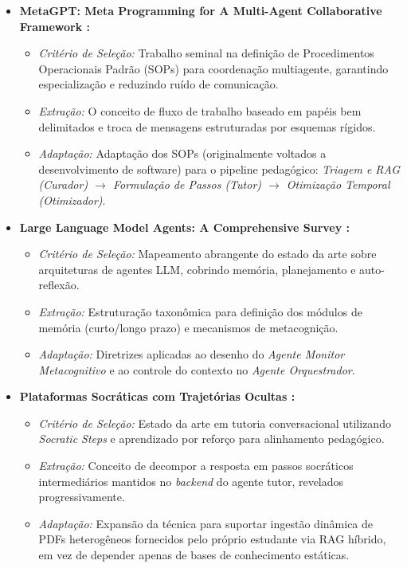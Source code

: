 \documentclass[12pt]{article}
\begin{document}
\begin{itemize}
    \item \textbf{MetaGPT: Meta Programming for A Multi-Agent Collaborative Framework \cite{hong2024metagpt}:}
    \begin{itemize}
        \item \textit{Critério de Seleção:} Trabalho seminal na definição de Procedimentos Operacionais Padrão (SOPs) para coordenação multiagente, garantindo especialização e reduzindo ruído de comunicação.
        \item \textit{Extração:} O conceito de fluxo de trabalho baseado em papéis bem delimitados e troca de mensagens estruturadas por esquemas rígidos.
        \item \textit{Adaptação:} Adaptação dos SOPs (originalmente voltados a desenvolvimento de software) para o pipeline pedagógico: \textit{Triagem e RAG (Curador) $\rightarrow$ Formulação de Passos (Tutor) $\rightarrow$ Otimização Temporal (Otimizador)}.
    \end{itemize}

    \item \textbf{Large Language Model Agents: A Comprehensive Survey \cite{lei2025agentsurvey}:}
    \begin{itemize}
        \item \textit{Critério de Seleção:} Mapeamento abrangente do estado da arte sobre arquiteturas de agentes LLM, cobrindo memória, planejamento e auto-reflexão.
        \item \textit{Extração:} Estruturação taxonômica para definição dos módulos de memória (curto/longo prazo) e mecanismos de metacognição.
        \item \textit{Adaptação:} Diretrizes aplicadas ao desenho do \textit{Agente Monitor Metacognitivo} e ao controle do contexto no \textit{Agente Orquestrador}.
    \end{itemize}

    \item \textbf{Plataformas Socráticas com Trajetórias Ocultas \cite{he2025medtutorr1,liu2024socraticlm}:}
    \begin{itemize}
        \item \textit{Critério de Seleção:} Estado da arte em tutoria conversacional utilizando \textit{Socratic Steps} e aprendizado por reforço para alinhamento pedagógico.
        \item \textit{Extração:} Conceito de decompor a resposta em passos socráticos intermediários mantidos no \textit{backend} do agente tutor, revelados progressivamente.
        \item \textit{Adaptação:} Expansão da técnica para suportar ingestão dinâmica de PDFs heterogêneos fornecidos pelo próprio estudante via RAG híbrido, em vez de depender apenas de bases de conhecimento estáticas.
    \end{itemize}


\end{itemize}
\end{document}
